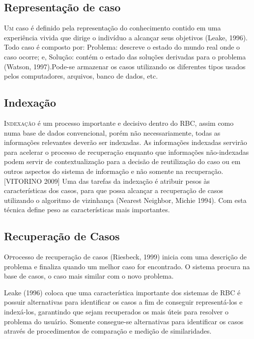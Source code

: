 \subsection{Representação de caso}
\lettrine{U}{m} caso é definido pela representação do conhecimento contido em uma experiência vivida que dirige o indivíduo a alcançar seus objetivos (Leake, 1996). Todo caso é composto por: Problema: descreve o estado do mundo real onde o caso ocorre; e, Solução: contém o estado das soluções derivadas para o problema (Watson, 1997).Pode-se armazenar os casos utilizando os diferentes tipos usados pelos computadores, arquivos, banco de dados, etc.

\subsection{Indexação}
\lettrine{I}{ndexação} é um processo importante e decisivo dentro do RBC, assim como numa base de dados convencional, porém não necessariamente, todas as informações relevantes deverão ser indexadas. As informações indexadas servirão para acelerar o processo de recuperação enquanto que informações não-indexadas podem servir de contextualização para a decisão de reutilização do caso ou em outros aspectos do sistema de informação e não somente na recuperação. [VITORINO 2009] Uma das tarefas da indexação é atribuir pesos às características dos casos, para que possa alcançar a recuperação de casos utilizando o algoritmo de vizinhança (Nearest Neighbor, Michie 1994). Com esta técnica define peso as características mais importantes.

\subsection{Recuperação de Casos}
\lettrine{O} processo de recuperação de casos (Riesbeck, 1999) inicia com uma descrição de problema e finaliza quando um melhor caso for encontrado. O sistema procura na base de casos, o caso mais similar com o novo problema.

Leake (1996) coloca que uma característica importante dos sistemas de RBC é possuir alternativas para identificar os casos a fim de conseguir representá-los e indexá-los, garantindo que sejam recuperados os mais úteis para resolver o problema do usuário. Somente consegue-se alternativas para identificar os casos através de procedimentos de comparação e medição de similaridades.

